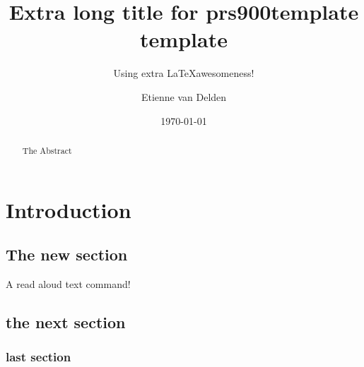 \documentclass[9pt]{memoir}
\begin{document}
	
    
    \renewcommand{\contentsname}{Table of Contents} %
    
	\title{Extra long title for prs900template template}
    \subtitle{Using extra \LaTeX awesomeness!}
	\author{Etienne van Delden}
	\date{\today}
    
    
   	\maketitle
    \thispagestyle{empty}
    
    \begin{figure}[b]
        \begin{abstract}
            The Abstract
        \end{abstract}
    \end{figure}

    \newpage
   \setcounter{tocdepth}{1}
    \tableofcontents*
    
    
        
	\mainmatter

	\chapter{Introduction}
	
        \section{The new section}\noindent    
        A read aloud text command!
         \lipsum[2-2]
        \section{the next section}
            \lipsum[3-4]
        \subsection{last section}
            \lipsum[4-5]
	
\end{document}

